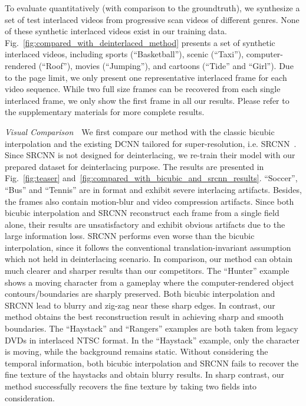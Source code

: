 \documentclass[acmtog]{acmart}
\begin{document}
To evaluate quantitatively (with comparison to the groundtruth), we 
synthesize a set of test interlaced videos from progressive scan videos of different
genres. None of these synthetic interlaced videos exist in our training data.
Fig.~\ref{fig:compared_with_deinterlaced_method} presents a set of synthetic interlaced 
videos, including sports (``Basketball''), scenic
(``Taxi''), computer-rendered (``Roof''), movies (``Jumping''), and
cartoons (``Tide'' and ``Girl''). Due to the page limit, we only present one
representative interlaced frame for each video sequence. While two full size
frames can be recovered from each single interlaced frame, we only show the
first frame in all our results. Please refer to the supplementary materials for
more complete results.

\vspace{0.15in}
\noindent\emph{Visual Comparison}\,\,\,\,
We first compare our method with the classic bicubic interpolation and the
existing DCNN tailored for super-resolution, i.e. SRCNN~\cite{dong2016image}.
Since SRCNN is not designed for deinterlacing, we re-train their model with our
prepared dataset for deinterlacing purpose. The results are presented in
Fig.~\ref{fig:teaser} and~\ref{fig:compared_with_bicubic_and_srcnn_results}. ``Soccer'', ``Bus'' and ``Tennis'' are in  format and exhibit severe interlacing
artifacts. Besides, the frames also contain motion-blur and video
compression artifacts. Since both bicubic interpolation and SRCNN reconstruct
each frame from a single field alone, their results are unsatisfactory and
exhibit obvious artifacts due to the large information loss. 
SRCNN performs even worse than the bicubic interpolation, since it
follows the conventional translation-invariant assumption which not held in
deinterlacing scenario. In comparison, our method can obtain much clearer and sharper
results than our competitors. The ``Hunter'' example shows a moving character
from a gameplay where the computer-rendered object
contours/boundaries are sharply preserved. Both bicubic interpolation and SRCNN lead
to blurry and zig-zag near these sharp edges. In contrast, our method obtains
the best reconstruction result in achieving sharp and smooth boundaries. The ``Haystack''
and ``Rangers'' examples are both taken from legacy DVDs in interlaced NTSC
format. In the ``Haystack'' example, only the character is moving, while the
background remains static. Without considering the temporal information, both bicubic
interpolation and SRCNN fails to recover the fine texture of the haystacks and
obtain blurry results. In sharp contrast, our method successfully recovers the
fine texture by taking two fields into consideration.
\end{document}
